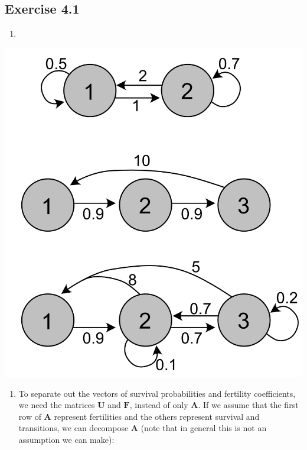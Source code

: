 \documentclass[
]{book}
\providecommand{\tightlist}{%
  \setlength{\itemsep}{0pt}\setlength{\parskip}{0pt}}
\begin{document}
\hypertarget{exercise-4.1-1}{%
\subsection*{Exercise 4.1}\label{exercise-4.1-1}}

\begin{enumerate}
\def\labelenumi{\arabic{enumi}.}
\item
\end{enumerate}

\includegraphics[width=0.6\linewidth]{LifeCycleEx41}

\begin{enumerate}
\def\labelenumi{\arabic{enumi}.}
\setcounter{enumi}{1}
\tightlist
\item
  To separate out the vectors of survival probabilities and fertility coefficients, we need the matrices \(\mathbf{U}\) and \(\mathbf{F}\), instead of only \(\mathbf{A}\). If we assume that the first row of \(\mathbf{A}\) represent fertilities and the others represent survival and transitions, we can decompose \(\mathbf{A}\) (note that in general this is not an assumption we can make):
\end{enumerate}
\end{document}
